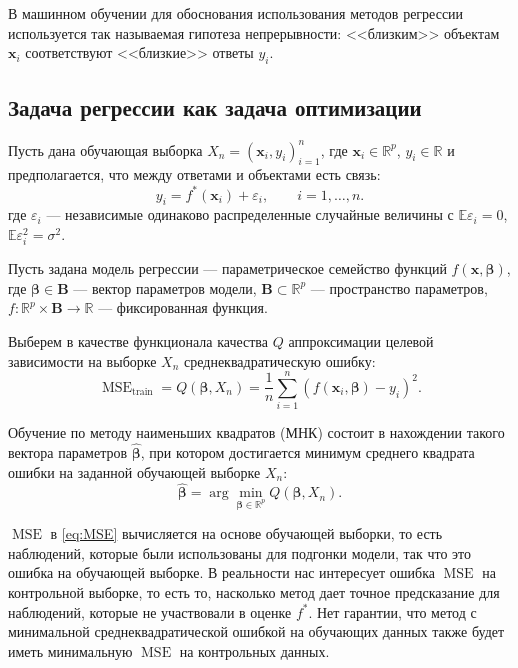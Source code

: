 \documentclass[12pt,a4paper,final]{article}
\DeclareMathOperator{\MSE}{MSE}
\newcommand{\1}{\mathds{1}}
\begin{document}
В машинном обучении для обоснования использования методов регрессии используется так называемая гипотеза непрерывности: <<близким>> объектам $\mathbf x_i$ соответствуют <<близкие>> ответы $y_i$.

\subsection{Задача регрессии как задача оптимизации}

Пусть дана обучающая выборка $X_{n}=(\mathbf x_i,y_{i})_{i=1}^{n}$, где $\mathbf x_i\in\mathbb{R}^{p}$, $y_{i}\in\mathbb{R}$ и предполагается, что между ответами и объектами есть связь:
\begin{equation*}
	y_{i}=f^{\ast}(\mathbf x_i)+\varepsilon_{i},
	\qquad 
	i=1,\ldots,n.
\end{equation*}
где $\varepsilon_{i}$ --- независимые одинаково распределенные случайные величины с $\mathbb{E}\varepsilon_{i}=0$, $\mathbb{E}\varepsilon_{i}^{2}=\sigma^{2}$.

Пусть задана модель регрессии --- параметрическое семейство функций $f(\mathbf x,\bm\beta)$, где $\bm\beta\in \bm B$ --- вектор параметров модели, $\bm B\subset\mathbb{R}^{p}$ --- пространство параметров,
$f:\mathbb{R}^{p}\times \bm B\rightarrow\mathbb{R}$ --- фиксированная функция.

Выберем в качестве функционала качества $Q$ аппроксимации целевой зависимости на выборке $X_{n}$ среднеквадратическую ошибку:
\begin{equation}\label{eq:MSE}
	\MSE_{\text{train}}
	=
	Q(\bm\beta,X_{n})=
	\frac{1}{n}
	\sum_{i=1}^{n}
	(f(\mathbf x_{i},\bm\beta)-y_{i})^{2}.
\end{equation}

Обучение по методу наименьших квадратов (МНК) состоит в нахождении такого вектора параметров $\hat{\bm\beta}$, при котором достигается минимум среднего квадрата ошибки на заданной обучающей выборке $X_{n}$:
\begin{equation*}
	\hat{\bm\beta}=
	\arg\min_{\bm\beta \in\mathbb{R}^{p}}
	Q(\bm\beta,X_{n}).
\end{equation*}

$\MSE$ в \eqref{eq:MSE} вычисляется на основе обучающей выборки, то есть наблюдений, которые были использованы для подгонки модели, так что это ошибка на обучающей выборке. В реальности нас интересует ошибка $\MSE$ на контрольной выборке, то есть то, насколько метод дает точное предсказание для наблюдений, которые не участвовали в оценке $f^{\ast}$. 
Нет гарантии, что метод с минимальной среднеквадратической ошибкой на обучающих данных также будет иметь минимальную $\MSE$ на контрольных данных.
\end{document}

